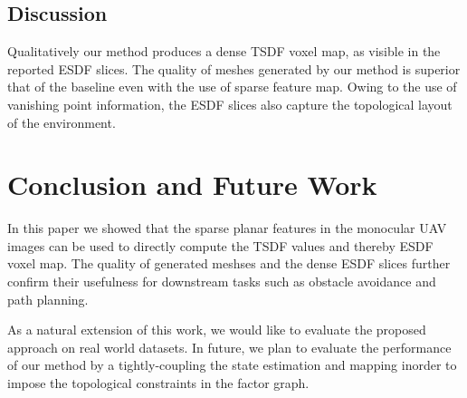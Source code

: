 \subsection{Discussion}
Qualitatively our method produces a dense TSDF voxel map, as visible in the reported ESDF slices. The quality of meshes generated by our method is superior that of the baseline even with the use of sparse feature map. Owing to the use of vanishing point information, the ESDF slices also capture the topological layout of the environment.

\section{Conclusion and Future Work}
In this paper we showed that the sparse planar features in the monocular UAV images can be used to directly compute the TSDF values and thereby ESDF voxel map. The quality of generated meshses and the dense ESDF slices further confirm their usefulness for downstream tasks such as obstacle avoidance and path planning.

As a natural extension of this work, we would like to evaluate the proposed approach on real world datasets. In future, we plan to evaluate the performance of our method by a tightly-coupling the state estimation and mapping inorder to impose the topological constraints in the factor graph.